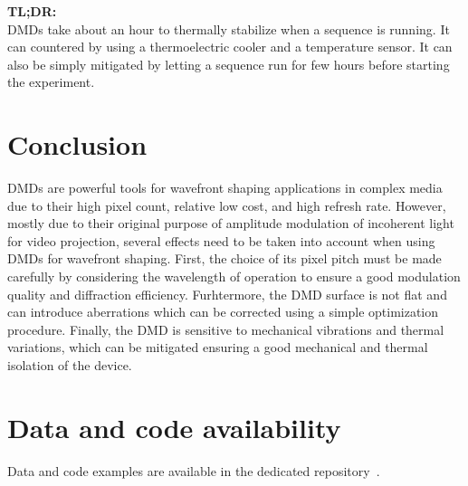 \documentclass[12pt]{iopart}
\begin{document}
\begin{tldr}
  \textbf{TL;DR:}\\
  DMDs take about an hour to thermally stabilize when a sequence is running.
  It can countered by using a thermoelectric cooler
  and a temperature sensor.
  It can also be simply mitigated by letting a sequence run for few hours
  before starting the experiment.
\end{tldr}

\section{Conclusion}
DMDs are powerful tools for wavefront shaping applications in complex media
due to their high pixel count, relative low cost, and high refresh rate.
However, mostly due to their original purpose of amplitude modulation
of incoherent light for video projection,
several effects need to be taken into account when using DMDs for wavefront shaping.
First, the choice of its pixel pitch must be made carefully
by considering the wavelength of operation
to ensure a good modulation quality and diffraction efficiency.
Furhtermore, the DMD surface is not flat and can introduce aberrations
which can be corrected using a simple optimization procedure.
Finally, the DMD is sensitive to mechanical vibrations and thermal variations,
which can be mitigated ensuring a good mechanical and thermal isolation of the device.


\section*{Data and code availability}

\noindent Data and code examples are available in the dedicated repository~\cite{github}.




\end{document}
